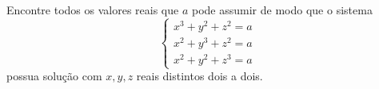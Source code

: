 Encontre todos os valores reais que $a$ pode assumir de modo que o sistema
$$\begin{cases}
x^3 + y^2 + z^2 = a\\
x^2 + y^3 + z^2 = a\\
x^2 + y^2 + z^3 = a
\end{cases}$$
possua solução com $x, y, z$ reais distintos dois a dois.